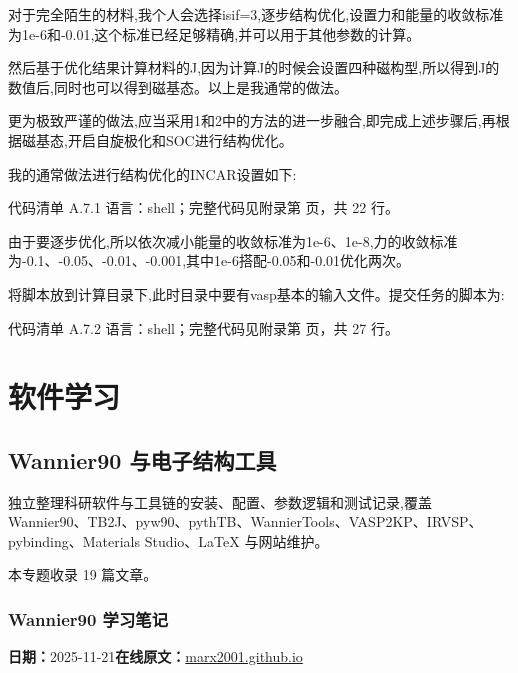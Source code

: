\documentclass[lang=cn,scheme=chinese,color=blue,device=normal,toc=onecol,math=cm]{elegantbook}
\begin{document}
对于完全陌生的材料,我个人会选择isif=3,逐步结构优化,设置力和能量的收敛标准为1e-6和-0.01,这个标准已经足够精确,并可以用于其他参数的计算。\par


然后基于优化结果计算材料的J,因为计算J的时候会设置四种磁构型,所以得到J的数值后,同时也可以得到磁基态。以上是我通常的做法。\par


更为极致严谨的做法,应当采用1和2中的方法的进一步融合,即完成上述步骤后,再根据磁基态,开启自旋极化和SOC进行结构优化。\par


我的通常做法进行结构优化的INCAR设置如下:\par


\begin{codeindexbox}{代码清单 A.7.1}
语言：shell；完整代码见附录第 \pageref{code:7:1} 页，共 22 行。
\end{codeindexbox}


由于要逐步优化,所以依次减小能量的收敛标准为1e-6、1e-8,力的收敛标准为-0.1、-0.05、-0.01、-0.001,其中1e-6搭配-0.05和-0.01优化两次。\par


将脚本放到计算目录下,此时目录中要有vasp基本的输入文件。提交任务的脚本为:\par


\begin{codeindexbox}{代码清单 A.7.2}
语言：shell；完整代码见附录第 \pageref{code:7:2} 页，共 27 行。
\end{codeindexbox}


\part{软件学习}
\chapter{Wannier90 与电子结构工具}
\begin{partbox}独立整理科研软件与工具链的安装、配置、参数逻辑和测试记录,覆盖 Wannier90、TB2J、pyw90、pythTB、WannierTools、VASP2KP、IRVSP、pybinding、Materials Studio、LaTeX 与网站维护。\par\medskip 本专题收录 19 篇文章。\end{partbox}

\section{Wannier90 学习笔记}
\begin{articlemeta}
\textbf{日期：}2025-11-21\hfill\textbf{在线原文：}\href{https://marx2001.github.io/sci-note\_posts/20251121-w}{marx2001.github.io}
\end{articlemeta}
\end{document}
